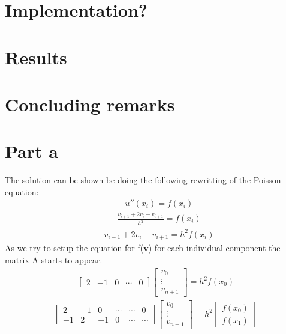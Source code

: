 \documentclass[american,a4paper,12pt]{article}
\renewcommand{\vec}[1]{\mathbf{#1}} %
\begin{document}
\section{Implementation?}
\section{Results}
\section{Concluding remarks}








\section{Part a}
The solution can be shown be doing the following rewritting of the Poisson equation:
\begin{align*}
  -u''(x_i) = f(x_i)
\end{align*}
\begin{align*}
  -\frac{v_{i+1} + 2v_i - v_{i+1}}{h^2} = f(x_i)
\end{align*}
\begin{align*}
  -v_{i-1} + 2v_i - v_{i+1} = h^2f(x_i)
\end{align*}
As we try to setup the equation for f($\vec{v}$) for each individual component the matrix A starts to appear.
\begin{align*}
      \begin{bmatrix}
        2 & -1 & 0 & \cdots & 0
      \end{bmatrix}
      \begin{bmatrix}
        v_0 \\
        \vdots \\
        v_{n+1}
      \end{bmatrix}
= h^2f(x_0)
\end{align*}
\begin{align*}
      \begin{bmatrix}
        2 & -1 & 0 & \cdots & \cdots & 0 \\
        -1 & 2 & -1 & 0 & \cdots & \cdots
      \end{bmatrix}
      \begin{bmatrix}
        v_0 \\
        \vdots \\
        v_{n+1}
      \end{bmatrix}
= h^2
      \begin{bmatrix}
        f(x_0) \\
        f(x_1)
      \end{bmatrix}
\end{align*}
\end{document}
